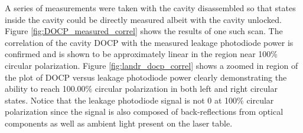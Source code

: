 A series of measurements were taken with the cavity disassembled so that states inside the cavity could be directly measured albeit with the cavity unlocked. Figure \ref{fig:DOCP_measured_correl} shows the results of one such scan. The correlation of the cavity DOCP with the measured leakage photodiode power is confirmed and is shown to be approximately linear in the region near 100\% circular polarization. Figure \ref{fig:landr_docp_correl} shows a zoomed in region of the plot of DOCP versus leakage photodiode power clearly demonstrating the ability to reach 100.00\% circular polarization in both left and right circular states. Notice that the leakage photodiode signal is not 0 at 100\% circular polarization since the signal is also composed of back-reflections from optical components as well as ambient light present on the laser table.

